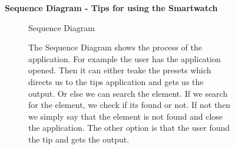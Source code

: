 \documentclass{article}
\begin{document}
	\begin{figure}[htbp]
		\textbf{Sequence Diagram - Tips for using the Smartwatch}
		\centering
		\begin{subfigure}{\textwidth}
			\resizebox{\textwidth}{!}{}
			\caption{Sequence Diagram}
		\end{subfigure}
		\begin{subfigure}{\textwidth}
			The Sequence Diagram shows the process of the application. For example the user has the application opened. Then it can
			either teake the presets which directs us to the tips application and gets us the output. Or else we can search the element. 
			If we search for the element, we check if its found or not. If not then we simply say that the element is not found and close the application. 
			The other option is that the user found the tip and gets the output. 
		\end{subfigure}
	\end{figure}
	\clearpage
\end{document}
